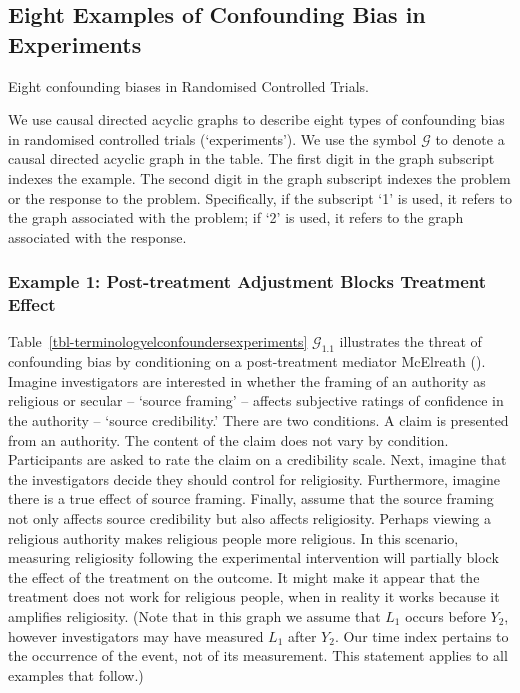 \documentclass[
  single column]{article}
\begin{document}
\subsection{Eight Examples of Confounding Bias in
Experiments}\label{eight-examples-of-confounding-bias-in-experiments}

\begin{table}

\caption{\label{tbl-terminologyelconfoundersexperiments}Eight
confounding biases in Randomised Controlled Trials.}

\centering{

\terminologyelconfoundersexperiments

}

\end{table}%

We use causal directed acyclic graphs to describe eight types of
confounding bias in randomised controlled trials (`experiments'). We use
the symbol \(\mathcal{G}\) to denote a causal directed acyclic graph in
the table. The first digit in the graph subscript indexes the example.
The second digit in the graph subscript indexes the problem or the
response to the problem. Specifically, if the subscript `1' is used, it
refers to the graph associated with the problem; if `2' is used, it
refers to the graph associated with the response.

\subsubsection{Example 1: Post-treatment Adjustment Blocks Treatment
Effect}\label{example-1-post-treatment-adjustment-blocks-treatment-effect}

Table~\ref{tbl-terminologyelconfoundersexperiments}
\(\mathcal{G}_{1.1}\) illustrates the threat of confounding bias by
conditioning on a post-treatment mediator McElreath
(). Imagine investigators are
interested in whether the framing of an authority as religious or
secular -- `source framing' -- affects subjective ratings of confidence
in the authority -- `source credibility.' There are two conditions. A
claim is presented from an authority. The content of the claim does not
vary by condition. Participants are asked to rate the claim on a
credibility scale. Next, imagine that the investigators decide they
should control for religiosity. Furthermore, imagine there is a true
effect of source framing. Finally, assume that the source framing not
only affects source credibility but also affects religiosity. Perhaps
viewing a religious authority makes religious people more religious. In
this scenario, measuring religiosity following the experimental
intervention will partially block the effect of the treatment on the
outcome. It might make it appear that the treatment does not work for
religious people, when in reality it works because it amplifies
religiosity. (Note that in this graph we assume that \(L_1\) occurs
before \(Y_2\), however investigators may have measured \(L_1\) after
\(Y_2\). Our time index pertains to the occurrence of the event, not of
its measurement. This statement applies to all examples that follow.)
\end{document}

